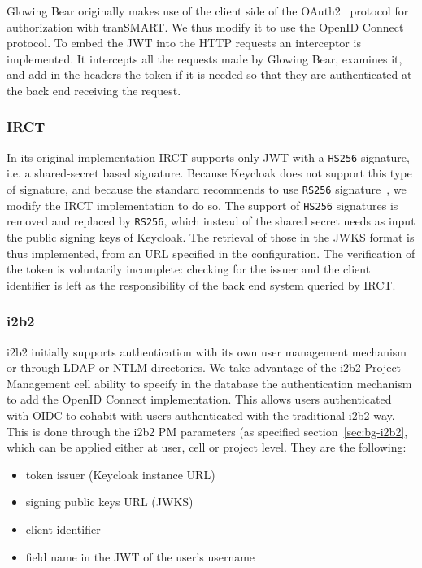 Glowing Bear originally makes use of the client side of the OAuth2~\cite{oauth2} protocol for authorization with tranSMART. 
We thus modify it to use the OpenID Connect protocol.
To embed the JWT into the HTTP requests an interceptor is implemented. 
It intercepts all the requests made by Glowing Bear, examines it, and add in the headers the token if it is needed so that they are authenticated at the back end receiving the request.

\subsubsection{IRCT}

In its original implementation IRCT supports only JWT with a \verb|HS256| signature, i.e. a shared-secret based signature. 
Because Keycloak does not support this type of signature, and because the standard recommends to use \verb|RS256| signature~\cite{todo}, we modify the IRCT implementation to do so. 
The support of \verb|HS256| signatures is removed and replaced by \verb|RS256|, which instead of the shared secret needs as input the public signing keys of Keycloak.
The retrieval of those in the JWKS format is thus implemented, from an URL specified in the configuration.
The verification of the token is voluntarily incomplete: checking for the issuer and the client identifier is left as the responsibility of the back end system queried by IRCT.

\subsubsection{i2b2}

i2b2 initially supports authentication with its own user management mechanism or through LDAP or NTLM directories.
We take advantage of the i2b2 Project Management cell ability to specify in the database the authentication mechanism to add the OpenID Connect implementation.
This allows users authenticated with OIDC to cohabit with users authenticated with the traditional i2b2 way.
This is done through the i2b2 PM parameters (as specified section~\ref{sec:bg-i2b2}, which can be applied either at user, cell or project level. 
They are the following:

\begin{itemize}
    \item token issuer (Keycloak instance URL)
    \item signing public keys URL (JWKS)
    \item client identifier
    \item field name in the JWT of the user's username
\end{itemize}

